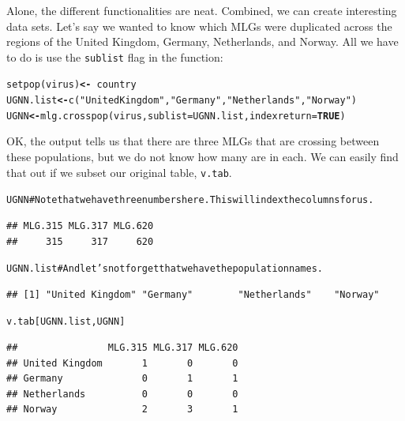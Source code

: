 \documentclass[letterpaper]{article}\usepackage[]{graphicx}\usepackage[]{color}
\makeatletter
\newcommand{\hlnum}[1]{\textcolor[rgb]{0.502,0,0.502}{\textbf{#1}}}%
\newcommand{\hlstr}[1]{\textcolor[rgb]{0.651,0.522,0}{#1}}%
\newcommand{\hlcom}[1]{\textcolor[rgb]{1,0.502,0}{#1}}%
\newcommand{\hlopt}[1]{\textcolor[rgb]{1,0,0.502}{\textbf{#1}}}%
\newcommand{\hlstd}[1]{\textcolor[rgb]{0,0,0}{#1}}%
\newcommand{\hlkwb}[1]{\textcolor[rgb]{0.502,0.502,0.753}{\textbf{#1}}}%
\newcommand{\hlkwc}[1]{\textcolor[rgb]{0,0.502,0.753}{#1}}%
\newcommand{\hlkwd}[1]{\textcolor[rgb]{0,0.267,0.4}{#1}}%
\newenvironment{kframe}{%
 \def\at@end@of@kframe{}%
 \ifinner\ifhmode%
  \def\at@end@of@kframe{\end{minipage}}%
  \begin{minipage}{\columnwidth}%
 \fi\fi%
 \def\FrameCommand##1{\hskip\@totalleftmargin \hskip-\fboxsep
 \colorbox{shadecolor}{##1}\hskip-\fboxsep
     \hskip-\linewidth \hskip-\@totalleftmargin \hskip\columnwidth}%
 \MakeFramed {\advance\hsize-\width
   \@totalleftmargin\z@ \linewidth\hsize
   \@setminipage}}%
 {\par\unskip\endMakeFramed%
 \at@end@of@kframe}
\newenvironment{knitrout}{}{} %
\newcommand{\tab}{\hspace*{1em}}
\makeatother
\begin{document}
\tab\tab Alone, the different functionalities are neat. Combined, we can create interesting data sets. Let's say we wanted to know which MLGs were duplicated across the regions of the United Kingdom, Germany, Netherlands, and Norway. All we have to do is use the \texttt{sublist} flag in the function:
\begin{knitrout}\footnotesize
{}\color{fgcolor}\begin{kframe}
\begin{alltt}
\hlkwd{setpop}\hlstd{(virus)} \hlkwb{<-} \hlopt{~}\hlstd{country}
\hlstd{UGNN.list} \hlkwb{<-} \hlkwd{c}\hlstd{(}\hlstr{"United Kingdom"}\hlstd{,} \hlstr{"Germany"}\hlstd{,} \hlstr{"Netherlands"}\hlstd{,} \hlstr{"Norway"}\hlstd{)}
\hlstd{UGNN} \hlkwb{<-} \hlkwd{mlg.crosspop}\hlstd{(virus,} \hlkwc{sublist} \hlstd{= UGNN.list,} \hlkwc{indexreturn} \hlstd{=} \hlnum{TRUE}\hlstd{)}
\end{alltt}
\end{kframe}
\end{knitrout}

OK, the output tells us that there are three MLGs that are crossing between these
populations, but we do not know how many are in each. We can easily find that out if we subset our original table, \texttt{v.tab}. 

\begin{knitrout}\footnotesize
{}\color{fgcolor}\begin{kframe}
\begin{alltt}
\hlstd{UGNN}  \hlcom{# Note that we have three numbers here. This will index the columns for us.}
\end{alltt}
\begin{verbatim}
## MLG.315 MLG.317 MLG.620 
##     315     317     620
\end{verbatim}
\begin{alltt}
\hlstd{UGNN.list}  \hlcom{# And let's not forget that we have the population names.}
\end{alltt}
\begin{verbatim}
## [1] "United Kingdom" "Germany"        "Netherlands"    "Norway"
\end{verbatim}
\begin{alltt}
\hlstd{v.tab[UGNN.list, UGNN]}
\end{alltt}
\begin{verbatim}
##                MLG.315 MLG.317 MLG.620
## United Kingdom       1       0       0
## Germany              0       1       1
## Netherlands          0       0       0
## Norway               2       3       1
\end{verbatim}
\end{kframe}
\end{knitrout}
\end{document}
